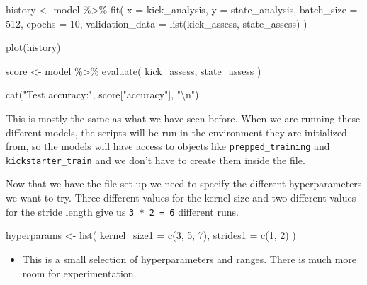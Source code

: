 \documentclass[
]{krantz}
\makeatletter
\newenvironment{Shaded}{\begin{snugshade}}{\end{snugshade}}
\newcommand{\AttributeTok}[1]{\textcolor[rgb]{0.77,0.63,0.00}{#1}}
\newcommand{\DecValTok}[1]{\textcolor[rgb]{0.00,0.00,0.81}{#1}}
\newcommand{\FunctionTok}[1]{\textcolor[rgb]{0.00,0.00,0.00}{#1}}
\newcommand{\NormalTok}[1]{#1}
\newcommand{\OtherTok}[1]{\textcolor[rgb]{0.56,0.35,0.01}{#1}}
\newcommand{\SpecialCharTok}[1]{\textcolor[rgb]{0.00,0.00,0.00}{#1}}
\newcommand{\StringTok}[1]{\textcolor[rgb]{0.31,0.60,0.02}{#1}}
\newenvironment{kframe}{%
\medskip{}
\setlength{\fboxsep}{.8em}
 \def\at@end@of@kframe{}%
 \ifinner\ifhmode%
  \def\at@end@of@kframe{\end{minipage}}%
  \begin{minipage}{\columnwidth}%
 \fi\fi%
 \def\FrameCommand##1{\hskip\@totalleftmargin \hskip-\fboxsep
 \colorbox{shadecolor}{##1}\hskip-\fboxsep
     \hskip-\linewidth \hskip-\@totalleftmargin \hskip\columnwidth}%
 \MakeFramed {\advance\hsize-\width
   \@totalleftmargin\z@ \linewidth\hsize
   \@setminipage}}%
 {\par\unskip\endMakeFramed%
 \at@end@of@kframe}
\renewenvironment{Shaded}{\begin{kframe}}{\end{kframe}}
\newenvironment{rmdblock}[1]
  {\begin{shaded*}
  \begin{itemize}[left = -1cm, labelsep = 1cm]
  \renewcommand{\labelitemi}{
    \raisebox{-.7\height}[0pt][0pt]{
      {\setkeys{Gin}{width=3em,keepaspectratio}\texttt{[image: images/\#1]}}
    }
  }
 
  \item
  }
  {
  \end{itemize}
  \end{shaded*}
  }
\newenvironment{rmdnote}
  {\begin{rmdblock}{note}}
  {\end{rmdblock}}
\makeatother
\begin{document}
\begin{Shaded}
\begin{Highlighting}[]
\NormalTok{history }\OtherTok{\textless{}{-}}\NormalTok{ model }\SpecialCharTok{\%\textgreater{}\%}
  \FunctionTok{fit}\NormalTok{(}
    \AttributeTok{x =}\NormalTok{ kick\_analysis,}
    \AttributeTok{y =}\NormalTok{ state\_analysis,}
    \AttributeTok{batch\_size =} \DecValTok{512}\NormalTok{,}
    \AttributeTok{epochs =} \DecValTok{10}\NormalTok{,}
    \AttributeTok{validation\_data =} \FunctionTok{list}\NormalTok{(kick\_assess, state\_assess)}
\NormalTok{  )}

\FunctionTok{plot}\NormalTok{(history)}

\NormalTok{score }\OtherTok{\textless{}{-}}\NormalTok{ model }\SpecialCharTok{\%\textgreater{}\%} \FunctionTok{evaluate}\NormalTok{(}
\NormalTok{  kick\_assess, state\_assess}
\NormalTok{)}

\FunctionTok{cat}\NormalTok{(}\StringTok{"Test accuracy:"}\NormalTok{, score[}\StringTok{"accuracy"}\NormalTok{], }\StringTok{"}\SpecialCharTok{\textbackslash{}n}\StringTok{"}\NormalTok{)}
\end{Highlighting}
\end{Shaded}

This is mostly the same as what we have seen before. When we are running these different models, the scripts will be run in the environment they are initialized from, so the models will have access to objects like \texttt{prepped\_training} and \texttt{kickstarter\_train} and we don't have to create them inside the file.

Now that we have the file set up we need to specify the different hyperparameters we want to try. Three different values for the kernel size and two different values for the stride length give us \texttt{3\ *\ 2\ =\ 6} different runs.

\begin{Shaded}
\begin{Highlighting}[]
\NormalTok{hyperparams }\OtherTok{\textless{}{-}} \FunctionTok{list}\NormalTok{(}
  \AttributeTok{kernel\_size1 =} \FunctionTok{c}\NormalTok{(}\DecValTok{3}\NormalTok{, }\DecValTok{5}\NormalTok{, }\DecValTok{7}\NormalTok{),}
  \AttributeTok{strides1 =} \FunctionTok{c}\NormalTok{(}\DecValTok{1}\NormalTok{, }\DecValTok{2}\NormalTok{)}
\NormalTok{)}
\end{Highlighting}
\end{Shaded}

\begin{rmdnote}
This is a small selection of hyperparameters and ranges. There is much
more room for experimentation.
\end{rmdnote}
\end{document}
